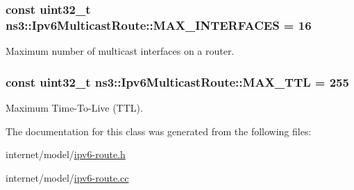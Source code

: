 \subsubsection[{\texorpdfstring{M\+A\+X\+\_\+\+I\+N\+T\+E\+R\+F\+A\+C\+ES}{MAX_INTERFACES}}]{\setlength{\rightskip}{0pt plus 5cm}const uint32\+\_\+t ns3\+::\+Ipv6\+Multicast\+Route\+::\+M\+A\+X\+\_\+\+I\+N\+T\+E\+R\+F\+A\+C\+ES = 16\hspace{0.3cm}{\ttfamily [static]}}\hypertarget{classns3_1_1Ipv6MulticastRoute_a68fd3354b3fd460b4f95bf78d859e75b}{}\label{classns3_1_1Ipv6MulticastRoute_a68fd3354b3fd460b4f95bf78d859e75b}


Maximum number of multicast interfaces on a router. 

\subsubsection[{\texorpdfstring{M\+A\+X\+\_\+\+T\+TL}{MAX_TTL}}]{\setlength{\rightskip}{0pt plus 5cm}const uint32\+\_\+t ns3\+::\+Ipv6\+Multicast\+Route\+::\+M\+A\+X\+\_\+\+T\+TL = 255\hspace{0.3cm}{\ttfamily [static]}}\hypertarget{classns3_1_1Ipv6MulticastRoute_a4e067c261e6c0abbeaaeb050f9b1727b}{}\label{classns3_1_1Ipv6MulticastRoute_a4e067c261e6c0abbeaaeb050f9b1727b}


Maximum Time-\/\+To-\/\+Live (T\+TL). 



The documentation for this class was generated from the following files\+:\begin{DoxyCompactItemize}
\item 
internet/model/\hyperlink{ipv6-route_8h}{ipv6-\/route.\+h}\item 
internet/model/\hyperlink{ipv6-route_8cc}{ipv6-\/route.\+cc}\end{DoxyCompactItemize}
